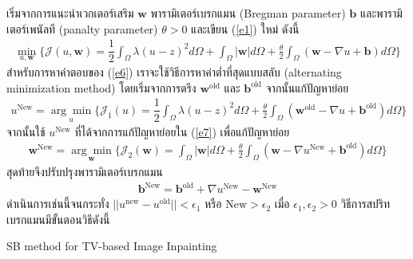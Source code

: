 \documentclass[hidelinks, a4paper,12pt]{article}
\numberwithin{equation}{section}							%
\numberwithin{equation}{section}
\begin{document}
{\begin{itemize}
	เริ่มจากการแนะนำเวกเตอร์เสริม $\boldsymbol{w}$ พารามิเตอร์เบรกแมน (Bregman parameter) $\boldsymbol{b}$ และพารามิเตอร์เพนัลที (panalty parameter) $\theta>0$ และเขียน (\ref{e1}) ใหม่ ดังนี้
	\begin{align}
	\min_{u,\boldsymbol{w}} \{ \mathcal{J}(u,\boldsymbol{w}) = \dfrac{1}{2} \int_{\Omega} \lambda(u-z)^2 d\Omega +  \int_{\Omega}  | \boldsymbol{w}|  d\Omega + \frac{\theta}{2} \int_{\Omega} (\boldsymbol{w} - \nabla u + \boldsymbol{b}) d\Omega \}
	\label{e6}
	\end{align}
	สำหรับการหาคำตอบของ (\ref{e6}) เราจะใช้วิธีการหาค่าต่ำที่สุดแบบสลับ (alternating minimization method) โดยเริ่มจากการตรึง $\boldsymbol{w}^{\text{old}}$ และ $\boldsymbol{b}^{\text{old}}$ จากนั้นแก้ปัญหาย่อย
	\begin{align}
	u^{\text{New}}=\underset{u}{\arg\min} \{ \mathcal{J}_1(u) = \dfrac{1}{2} \int_{\Omega} \lambda(u-z)^2 d\Omega + \frac{\theta}{2} \int_{\Omega} (\boldsymbol{w}^{\text{old}} - \nabla u + \boldsymbol{b}^{\text{old}}) d\Omega \}
	\label{e7}
	\end{align}
	จากนั้นใช้ $u^{\text{New}}$ ที่ได้จากการแก้ปัญหาย่อยใน (\ref{e7}) เพื่อแก้ปัญหาย่อย
	\begin{align}
	\boldsymbol{w}^{\text{New}}=\underset{\boldsymbol{w}}{\arg\min} \{ \mathcal{J}_2(\boldsymbol{w}) = \int_{\Omega}  |\boldsymbol{w}|  d\Omega  + \frac{\theta}{2} \int_{\Omega} (\boldsymbol{w} - \nabla u^{\text{New}} + \boldsymbol{b}^{\text{old}}) d\Omega \}
	\label{e8}
	\end{align}
	สุดท้ายจึงปรับปรุงพารามิเตอร์เบรกแมน 
	\begin{align}
	\boldsymbol{b}^{\text{New}}=\boldsymbol{b}^{\text{old}}+\nabla u^{\text{New}}-\boldsymbol{w}^{\text{New}}
	\label{e9}
	\end{align}
	ดำเนินการเช่นนี้จนกระทั่ง $||u^{\text{new}}-u^{\text{old}}||< \epsilon_1$ หรือ $\text{New}>\epsilon_2$ เมื่อ $\epsilon_1,\epsilon_2>0$  
	วิธีการสปริทเบรกแมนมีขั้นตอนวิธีดังนี้
	\begin{algorithm}[H]
		\caption{SB method for TV-based Image Inpainting}    
		

\end{algorithm}
\end{itemize}}
\end{document}
